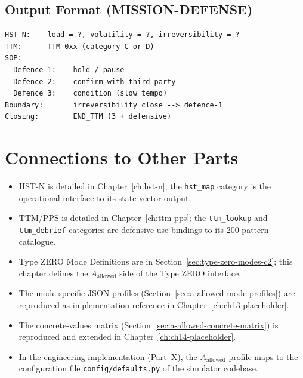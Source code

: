 \subsection{Output Format (MISSION-DEFENSE)}
\label{sec:a-allowed-mdef-output}

\begin{lstlisting}[basicstyle=\ttfamily\small,frame=single]
HST-N:    load = ?, volatility = ?, irreversibility = ?
TTM:      TTM-0xx (category C or D)
SOP:
  Defence 1:    hold / pause
  Defence 2:    confirm with third party
  Defence 3:    condition (slow tempo)
Boundary:       irreversibility close --> defence-1
Closing:        END_TTM (3 + defensive)
\end{lstlisting}

\section*{Connections to Other Parts}

\begin{itemize}
\item HST-N is detailed in Chapter~\ref{ch:hst-n}; the
\texttt{hst\_map} category is the operational interface to its
state-vector output.
\item TTM/PPS is detailed in Chapter~\ref{ch:ttm-pps}; the
\texttt{ttm\_lookup} and \texttt{ttm\_debrief} categories are
defensive-use bindings to its 200-pattern catalogue.
\item Type ZERO Mode Definitions are in
Section~\ref{sec:type-zero-modes-c2}; this chapter defines the
$A_{\mathrm{allowed}}$ side of the Type ZERO interface.
\item The mode-specific JSON profiles
(Section~\ref{sec:a-allowed-mode-profiles}) are reproduced as
implementation reference in
Chapter~\ref{ch:ch13-placeholder}.
\item The concrete-values matrix
(Section~\ref{sec:a-allowed-concrete-matrix}) is reproduced and
extended in Chapter~\ref{ch:ch14-placeholder}.
\item In the engineering implementation (Part~X), the
$A_{\mathrm{allowed}}$ profile maps to the configuration file
\texttt{config/defaults.py} of the simulator codebase.
\end{itemize}
